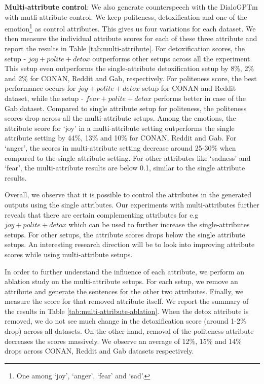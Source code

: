 \noindent\textbf{Multi-attribute control}: We also generate counterspeech with the DialoGPTm with mutli-attribute control. We keep politeness, detoxification and one of the emotion\footnote{One among `joy', `anger', `fear' and `sad'.} as control attributes. This gives us four variations for each dataset. We then measure the individual attribute scores for each of these three attribute and report the results in Table \ref{tab:multi-attribute}. For detoxification scores, the setup - $joy+polite+detox$ outperforms other setups across all the experiment. This setup even outperforms the single-attribute detoxification setup by 8\%, 2\% and 2\% for CONAN, Reddit and Gab, respectively. For politeness score, the best performance occurs for  $joy+polite+detox$ setup for CONAN and Reddit dataset, while the setup - $fear+polite+detox$ performs better in case of the Gab dataset. Compared to single attribute setup for politeness, the politeness scores drop across all the multi-attribute setups. Among the emotions, the attribute score for `joy' in a multi-attribute setting outperforms the single attribute setting by 44\%, 13\% and 10\% for CONAN, Reddit and Gab.  For `anger', the scores in multi-attribute setting decrease around 25-30\% when compared to the single attribute setting. For other attributes like `sadness' and `fear', the multi-attribute results are below 0.1, similar to the single attribute results.  

Overall, we observe that it is possible to control the attributes in the generated outputs using the single attributes. Our experiments with multi-attributes further reveals that there are certain complementing attributes for e.g $joy+polite+detox$  which can be used to further increase the single-attributes setups. For other setups, the attribute scores drops below the single attribute setups. An interesting research direction will be to look into improving attribute scores while using multi-attribute setups.

In order to further understand the influence of each attribute, we perform an ablation study on the multi-attribute setups. For each setup, we remove an attribute and generate the sentences for the other two attributes. Finally, we measure the score for that removed attribute itself. We report the summary of the results in Table \ref{tab:multi-attribute-ablation}. When the detox attribute is removed, we do not see much change in the detoxification score (around 1-2\% drop) across all datasets. On the other hand, removal of the politeness attribute decreases the scores massively. We observe an average of 12\%, 15\% and 14\% drops across CONAN, Reddit and Gab datasets respectively.

